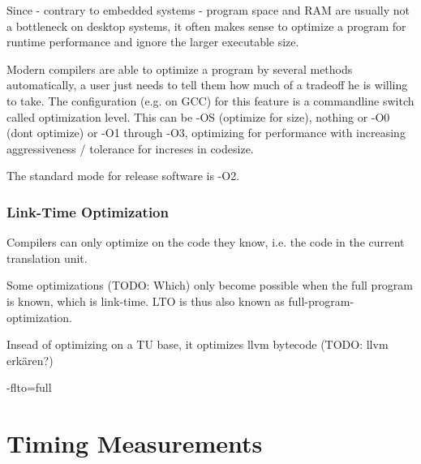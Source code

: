Since - contrary to embedded systems - program space and RAM are usually not a bottleneck on desktop systems, it often makes sense to optimize a program for runtime performance and ignore the larger executable size.

Modern compilers are able to optimize a program by several methods automatically, a user just needs to tell them how much of a tradeoff he is willing to take. The configuration (e.g. on GCC) for this feature is a commandline switch called optimization level. This can be -OS (optimize for size), nothing or -O0 (dont optimize) or -O1 through -O3, optimizing for performance with increasing aggressiveness / tolerance for increses in codesize.

The standard mode for release software is -O2.

\subsubsection{Link-Time Optimization}
Compilers can only optimize on the code they know, i.e. the code in the current translation unit.

Some optimizations (TODO: Which) only become possible when the full program is known, which is link-time. LTO is thus also known as full-program-optimization.

Insead of optimizing on a TU base, it optimizes llvm bytecode (TODO: llvm erkären?)

-flto=full

\section{Timing Measurements}

